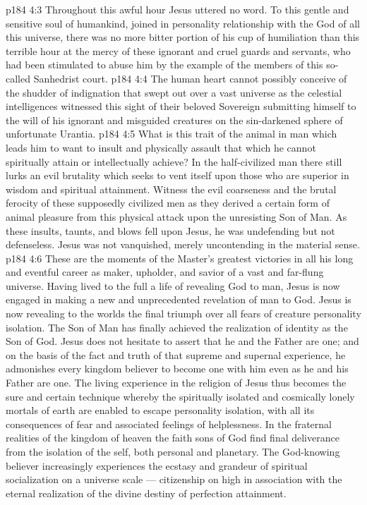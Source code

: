 \vs p184 4:3 Throughout this awful hour Jesus uttered no word. To this gentle and sensitive soul of humankind, joined in personality relationship with the God of all this universe, there was no more bitter portion of his cup of humiliation than this terrible hour at the mercy of these ignorant and cruel guards and servants, who had been stimulated to abuse him by the example of the members of this so\hyp{}called Sanhedrist court.
\vs p184 4:4 \pc The human heart cannot possibly conceive of the shudder of indignation that swept out over a vast universe as the celestial intelligences witnessed this sight of their beloved Sovereign submitting himself to the will of his ignorant and misguided creatures on the sin\hyp{}darkened sphere of unfortunate Urantia.
\vs p184 4:5 What is this trait of the animal in man which leads him to want to insult and physically assault that which he cannot spiritually attain or intellectually achieve? In the half\hyp{}civilized man there still lurks an evil brutality which seeks to vent itself upon those who are superior in wisdom and spiritual attainment. Witness the evil coarseness and the brutal ferocity of these supposedly civilized men as they derived a certain form of animal pleasure from this physical attack upon the unresisting Son of Man. As these insults, taunts, and blows fell upon Jesus, he was undefending but not defenseless. Jesus was not vanquished, merely uncontending in the material sense.
\vs p184 4:6 These are the moments of the Master’s greatest victories in all his long and eventful career as maker, upholder, and savior of a vast and far\hyp{}flung universe. Having lived to the full a life of revealing God to man, Jesus is now engaged in making a new and unprecedented revelation of man to God. Jesus is now revealing to the worlds the final triumph over all fears of creature personality isolation. The Son of Man has finally achieved the realization of identity as the Son of God. Jesus does not hesitate to assert that he and the Father are one; and on the basis of the fact and truth of that supreme and supernal experience, he admonishes every kingdom believer to become one with him even as he and his Father are one. The living experience in the religion of Jesus thus becomes the sure and certain technique whereby the spiritually isolated and cosmically lonely mortals of earth are enabled to escape personality isolation, with all its consequences of fear and associated feelings of helplessness. In the fraternal realities of the kingdom of heaven the faith sons of God find final deliverance from the isolation of the self, both personal and planetary. The God\hyp{}knowing believer increasingly experiences the ecstasy and grandeur of spiritual socialization on a universe scale --- citizenship on high in association with the eternal realization of the divine destiny of perfection attainment.
